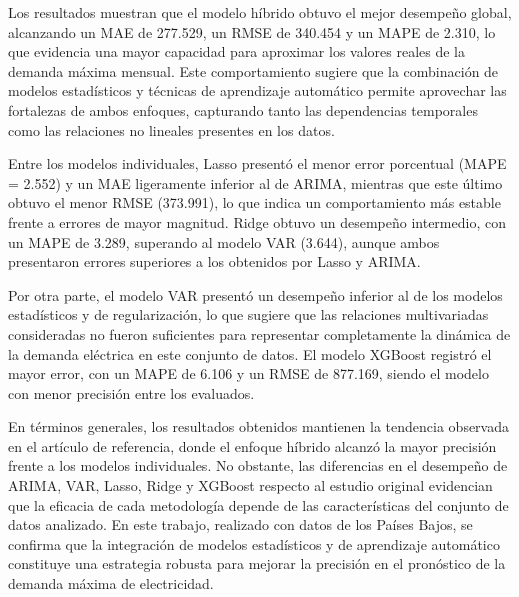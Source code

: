 Los resultados muestran que el modelo híbrido obtuvo el mejor desempeño global, alcanzando un MAE de 277.529, un RMSE de 340.454 y un MAPE de 2.310, lo que evidencia una mayor capacidad para aproximar los valores reales de la demanda máxima mensual. Este comportamiento sugiere que la combinación de modelos estadísticos y técnicas de aprendizaje automático permite aprovechar las fortalezas de ambos enfoques, capturando tanto las dependencias temporales como las relaciones no lineales presentes en los datos.

Entre los modelos individuales, Lasso presentó el menor error porcentual (MAPE = 2.552) y un MAE ligeramente inferior al de ARIMA, mientras que este último obtuvo el menor RMSE (373.991), lo que indica un comportamiento más estable frente a errores de mayor magnitud. Ridge obtuvo un desempeño intermedio, con un MAPE de 3.289, superando al modelo VAR (3.644), aunque ambos presentaron errores superiores a los obtenidos por Lasso y ARIMA.

Por otra parte, el modelo VAR presentó un desempeño inferior al de los modelos estadísticos y de regularización, lo que sugiere que las relaciones multivariadas consideradas no fueron suficientes para representar completamente la dinámica de la demanda eléctrica en este conjunto de datos. El modelo XGBoost registró el mayor error, con un MAPE de 6.106 y un RMSE de 877.169, siendo el modelo con menor precisión entre los evaluados.

En términos generales, los resultados obtenidos mantienen la tendencia observada en el artículo de referencia, donde el enfoque híbrido alcanzó la mayor precisión frente a los modelos individuales. No obstante, las diferencias en el desempeño de ARIMA, VAR, Lasso, Ridge y XGBoost respecto al estudio original evidencian que la eficacia de cada metodología depende de las características del conjunto de datos analizado. En este trabajo, realizado con datos de los Países Bajos, se confirma que la integración de modelos estadísticos y de aprendizaje automático constituye una estrategia robusta para mejorar la precisión en el pronóstico de la demanda máxima de electricidad.
